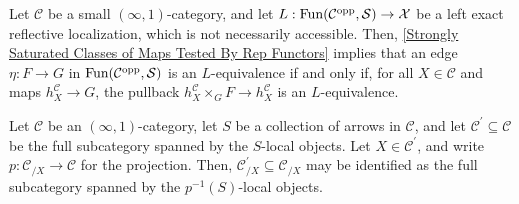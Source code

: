 \documentclass[10pt]{article}
\newcommand{\mS}{\mathcal S}
\newcommand{\C}{\mathcal C}
\newcommand{\cX}{\mathcal{X}}
\theoremstyle{witharg}
\theoremstyle{witharg}
\theoremstyle{witharg2}
\begin{document}
\begin{example}{}\label{Strongly Saturated Classes of Maps Tested By Rep Functors Cor}

    Let $\C$ be a small $(\infty,1)$-category, and let $L:\textnormal{Fun}(\C^{\textnormal{opp}},\mS)\rightarrow \cX$ be a left exact reflective localization, which is not necessarily accessible. Then, \ref{Strongly Saturated Classes of Maps Tested By Rep Functors} implies that an edge $\eta:F\rightarrow G$ in $\textnormal{Fun}(\C^{\textnormal{opp}},\mS)$ is an $L$-equivalence if and only if, for all $X\in \C$ and maps $h^\C_X\rightarrow G$, the pullback $h^\C_X\times_GF\rightarrow h^\C_X$ is an $L$-equivalence. 
    
\end{example}



\begin{lemma}{}\label{Reflective Localizations and Slices}

    Let $\C$ be an $(\infty,1)$-category, let $S$ be a collection of arrows in $\C$, and let $\C^\prime\subseteq \C$ be the full subcategory spanned by the $S$-local objects. Let $X\in \C^\prime$, and write $p:\C_{/X}\rightarrow \C$ for the projection. Then, $\C^\prime_{/X}\subseteq \C_{/X}$ may be identified as the full subcategory spanned by the $p^{-1}(S)$-local objects. 

\end{lemma}
\end{document}
